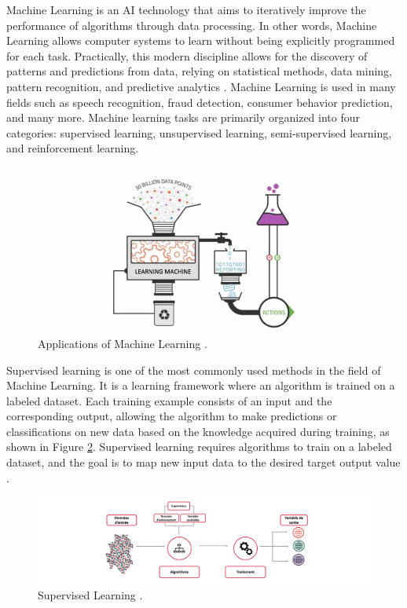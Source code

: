 Machine Learning is an AI technology that aims to iteratively improve the performance of algorithms through data processing. In other words, Machine Learning allows computer systems to learn without being explicitly programmed for each task. Practically, this modern discipline allows for the discovery of patterns and predictions from data, relying on statistical methods, data mining, pattern recognition, and predictive analytics \cite{lebigdata2018}. Machine Learning is used in many fields such as speech recognition, fraud detection, consumer behavior prediction, and many more. Machine learning tasks are primarily organized into four categories: supervised learning, unsupervised learning, semi-supervised learning, and reinforcement learning.\\

\begin{figure}[ht!]
	\centering
	\includegraphics[width=0.8\linewidth]{Chap1/images/Marchinelearning2}
	\caption{Applications of Machine Learning \cite{lebigdata2018}.}
	\label{fig:marchinelearning2}
\end{figure}


Supervised learning is one of the most commonly used methods in the field of Machine Learning. It is a learning framework where an algorithm is trained on a labeled dataset. Each training example consists of an input and the corresponding output, allowing the algorithm to make predictions or classifications on new data based on the knowledge acquired during training, as shown in Figure \ref{MarchinelearningSupervise}. Supervised learning requires algorithms to train on a labeled dataset, and the goal is to map new input data to the desired target output value \cite{miraftabzadeh2019}.\\

\begin{figure}[ht!]
	\centering
	\includegraphics[scale=0.3]{Chap1/images/MarchinelearningSupervise}
	\caption{Supervised Learning \cite{Armandine2022}.}
	\label{MarchinelearningSupervise}
\end{figure}

